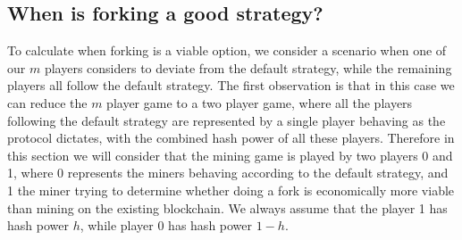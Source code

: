 %
%

\subsection{When is forking a good strategy?}
\label{sec-forkingstrategies}

To calculate when forking is a viable option, we consider a scenario when one of our $m$ players considers to deviate from the default strategy, while the remaining players all follow the default strategy. 
The first observation is that in this case we can reduce the $m$ player game to a two player game, where all the players following the default strategy are represented by a single player behaving as the protocol dictates, with the combined hash power of all these players. Therefore  in this section we will consider that the mining game is played by two players 0 and 1, where 0 represents the miners behaving according to the default strategy, and 1 the miner trying to determine whether doing a fork is economically more viable than mining on the existing blockchain. We always assume that the player 1 has hash power $h$, while player 0 has hash power $1-h$.

